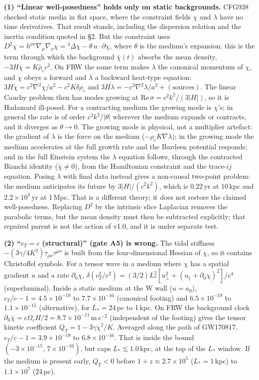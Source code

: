 \documentclass[10pt]{article}
\begin{document}
{{\textbf{(1) ``Linear well-posedness'' holds only on static backgrounds.} CFG938 checked static media in flat space, where the constraint fields $\chi$ and $\lambda$ have no time derivatives. That result stands, including the dispersion relation and the inertia condition quoted in \S2. But the constraint uses $D^2\chi=h^{\mu\nu}\nabla_\mu\nabla_\nu\chi={}^3\Delta\chi-\theta\,u\cdot\partial\chi$, where $\theta$ is the medium's expansion; this is the term through which the background $\bar\chi(t)$ absorbs the mean density, $-3H\dot{\bar\chi}=K\bar\rho_cc^2$. On FRW the same term makes $\lambda$ the canonical momentum of $\chi$, and $\chi$ obeys a forward and $\lambda$ a backward heat-type equation: $3H\dot\chi=c^2\nabla^2\chi/a^2-c^2K\delta\rho_c$ and $3H\dot\lambda=-c^2\nabla^2\lambda/a^2+(\text{sources})$. The linear Cauchy problem then has modes growing at $\mathrm{Re}\,\sigma=c^2k^2/(3|H|)$, so it is Hadamard ill-posed. For a contracting medium the growing mode is $\chi$'s; in general the rate is of order $c^2k^2/|\theta|$ wherever the medium expands or contracts, and it diverges as $\theta\to0$. The growing mode is physical, not a multiplier artefact: the gradient of $\lambda$ is the force on the medium ($-\rho_cK\nabla\lambda$); in the growing mode the medium accelerates at the full growth rate and the Bardeen potential responds; and in the full Einstein system the $\lambda$ equation follows, through the contracted Bianchi identity ($\dot{\bar\chi}\neq0$), from the Hamiltonian constraint and the trace-$ij$ equation. Posing $\lambda$ with final data instead gives a non-causal two-point problem: the medium anticipates its future by $3|H|/(c^2k^2)$, which is 0.22\,yr at 10\,kpc and $2.2\times10^3$\,yr at 1\,Mpc. That is a different theory; it does not restore the claimed well-posedness. Replacing $D^2$ by the intrinsic slice Laplacian removes the parabolic terms, but the mean density must then be subtracted explicitly; that repaired parent is not the action of v1.0, and it is under separate test.

\textbf{(2) ``$c_T=c$ (structural)'' (gate A5) is wrong.} The tidal stiffness $-(3\gamma/4K^2)\tau_{\mu\nu}\tau^{\mu\nu}$ is built from the four-dimensional Hessian of $\chi$, so it contains Christoffel symbols. For a tensor wave in a medium where $\chi$ has a spatial gradient $u$ and a rate $\partial_0\chi$, $\delta(c_T^2/c^2)=(3/2)L_*^2[u_\perp^2+(u_\parallel+\partial_0\chi)^2]/c^4$ (superluminal). Inside a static medium at the W wall ($u=a_0$), $c_T/c-1=4.5\times10^{-19}$ to $7.7\times10^{-16}$ (canonical footing) and $6.5\times10^{-19}$ to $1.1\times10^{-15}$ (alternative), for $L_*=24$\,pc to 1\,kpc. On FRW the background clock $\partial_0\bar\chi=c\Omega_cH/2=8.7\times10^{-11}$\,m\,s$^{-2}$ (independent of the footing) gives the tensor kinetic coefficient $Q_T=1-3\gamma\dot\chi^2/K$. Averaged along the path of GW170817, $c_T/c-1=3.9\times10^{-19}$ to $6.8\times10^{-16}$. That is inside the bound $(-3\times10^{-15},\,7\times10^{-16})$, but caps $L_*\lesssim1.0$\,kpc, at the top of the $L_*$ window. If the medium is present early, $Q_T<0$ before $1+z\approx2.7\times10^5$ ($L_*=1$\,kpc) to $1.1\times10^7$ (24\,pc).

}}
\end{document}
